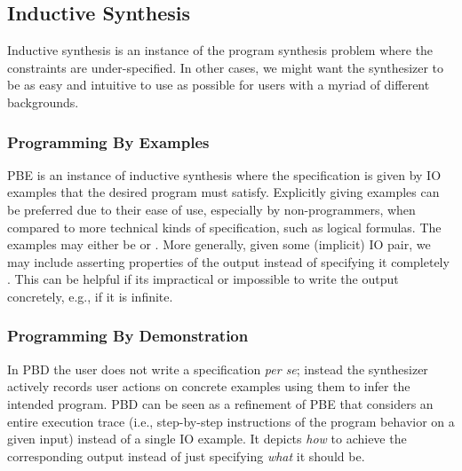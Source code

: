 \subsection{Inductive Synthesis}
\label{sec:inductive}


Inductive synthesis is an instance of the program synthesis problem where the
constraints are under-specified.  In other cases, we might want the synthesizer to be as easy and
intuitive to use as possible for users with a myriad of different backgrounds.

\subsubsection{Programming By Examples}

\ac{PBE} is an instance of inductive synthesis where the specification is given
by \ac{IO} examples that the desired program must satisfy. Explicitly giving
examples can be preferred due to their ease of use, especially by
non-programmers, when compared to more technical kinds of specification, such as
logical formulas. The examples may either be  or . More generally, given some
(implicit) \ac{IO} pair, we may include asserting properties of the output
instead of specifying it completely \cite{Gulwani2017, Polozov:2015:FFI}. This
can be helpful if its impractical or impossible to write the output concretely,
e.g., if it is infinite.

\subsubsection{Programming By Demonstration}


In \ac{PBD} the user does not write a specification \textit{per se}; instead the
synthesizer actively records user actions on concrete examples using them to
infer the intended program.  \ac{PBD} can be seen as a refinement of \ac{PBE} that
considers an entire execution trace (i.e., step-by-step instructions of the
program behavior on a given input) instead of a single \ac{IO} example. It
depicts \textit{how} to achieve the corresponding output instead of just
specifying \textit{what} it should be.

